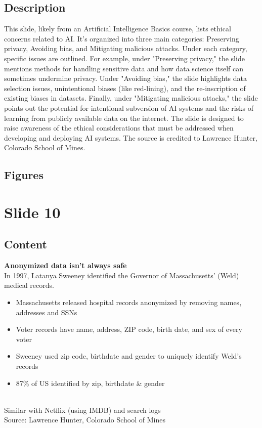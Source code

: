 \documentclass{article}%
\begin{document}
\subsection{Description}%
This slide, likely from an Artificial Intelligence Basics course, lists ethical concerns related to AI.  It's organized into three main categories: Preserving privacy, Avoiding bias, and Mitigating malicious attacks.  Under each category, specific issues are outlined.  For example, under "Preserving privacy," the slide mentions methods for handling sensitive data and how data science itself can sometimes undermine privacy.  Under "Avoiding bias," the slide highlights data selection issues, unintentional biases (like red-lining), and the re-inscription of existing biases in datasets.  Finally, under "Mitigating malicious attacks," the slide points out the potential for intentional subversion of AI systems and the risks of learning from publicly available data on the internet.  The slide is designed to raise awareness of the ethical considerations that must be addressed when developing and deploying AI systems.  The source is credited to Lawrence Hunter, Colorado School of Mines.%
\subsection{Figures}%
\begin{figure}[H]%
\centering%
\end{figure}

%
\newpage%
\section{Slide 10}%
\label{sec:Slide10}%
\subsection{Content}%

\textbf{Anonymized data isn't always safe} \\
In 1997, Latanya Sweeney identified the Governor of Massachusetts' (Weld) medical records. \\
\begin{itemize}
    \item Massachusetts released hospital records anonymized by removing names, addresses and SSNs
    \item Voter records have name, address, ZIP code, birth date, and sex of every voter
    \item Sweeney used zip code, birthdate and gender to uniquely identify Weld's records
    \item 87\% of US identified by zip, birthdate \& gender
\end{itemize} \\
Similar with Netflix (using IMDB) and search logs \\
Source: Lawrence Hunter, Colorado School of Mines
%
\end{document}
